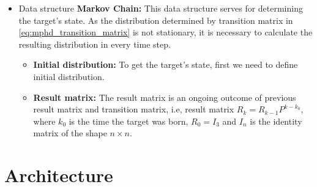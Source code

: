 \begin{itemize}
\begin{itemize}
      \end{itemize}
  \item Data structure \textbf{Markov Chain:} This data structure serves for determining the target's state. As the
  distribution determined by transition matrix in \eqref{eq:mphd_transition_matrix} is not stationary, it is necessary
  to calculate the resulting distribution in every time step.
      \begin{itemize}
        \item \textbf{Initial distribution:} To get the target's state, first we need to define initial distribution.
        \item \textbf{Result matrix:} The result matrix is an ongoing outcome of previous result matrix and transition
        matrix, i.e, result matrix $R_k = R_{k-1} P^{k-k_0}$, where $k_0$ is the time the target was born,
        $R_0 = I_3$ and $I_n$ is the identity matrix of the shape $n\times n$.
      \end{itemize}
\end{itemize}

\section{Architecture}
